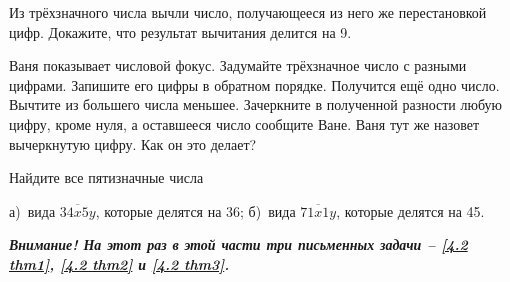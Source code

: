 \begin{thm}
    Из трёхзначного числа вычли число, получающееся из него же перестановкой цифр. Докажите, что результат вычитания делится на 9.
\end{thm}

\begin{thm} 
     Ваня показывает числовой фокус. Задумайте трёхзначное число с разными цифрами. Запишите его цифры в обратном порядке. Получится ещё одно число. Вычтите из большего числа меньшее. Зачеркните в полученной разности любую цифру, кроме нуля, а оставшееся число сообщите Ване. Ваня тут же назовет вычеркнутую цифру. Как он это делает?
\end{thm}

\begin{thm}
    Найдите все пятизначные числа 
    \par
    а)~вида $\overline{34x5y}$, которые делятся на 36; б)~вида $\overline{71x1y}$, которые делятся на 45. 
\end{thm}

\textbf{\textit{Внимание! На этот раз в этой части три письменных задачи – \ref{4.2 thm1}, \ref{4.2 thm2} и \ref{4.2 thm3}.}}


